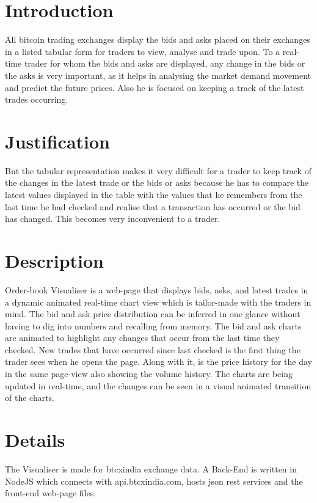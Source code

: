 \documentclass[12pt, a4paper]{report}
\begin{document}
\pagestyle{plain}
\def\title{Recommendation of tags in  using Metapaths}
\def\what{B. Tech Project Report}
\def\who{Prithwish Mukherjee (12CS10058)}
\def\guide{Prof. Animesh Mukherjee and Prof. Pawan Goyal}

\section{Introduction}

All bitcoin trading exchanges display the bids and asks placed on their exchanges in a listed tabular form for traders to view, analyse and trade upon. To a real-time trader for whom the bids and asks are displayed, any change in the bids or the asks is very important, as it helps in analysing the market demand movement and predict the future prices. Also he is focused on keeping a track of the latest trades occurring.

\section{Justification}

But the tabular representation makes it very difficult for a trader to keep track of the changes in the latest trade or the bids or asks because he has to compare the latest values displayed in the table with the values that he remembers from the last time he had checked and realise that a transaction has occurred or the bid has changed. This becomes very inconvenient to a trader.

\section{Description}

Order-book Visualiser is a web-page that displays bids, asks, and latest trades in a dynamic animated real-time chart view which is tailor-made with the traders in mind. The bid and ask price distribution can be inferred in one glance without having to dig into numbers and recalling from memory. The bid and ask charts are animated to highlight any changes that occur from the last time they checked. New trades that have occurred since last checked is the first thing the trader sees when he opens the page. Along with it, is the price history for the day in the same page-view also showing the volume history. The charts are being updated in real-time, and the changes can be seen in a visual animated transition of the charts.

\section{Details}

The Visualiser is made for btcxindia exchange data.
A Back-End is written in NodeJS which connects with api.btcxindia.com, hosts json rest services and the front-end web-page files.
\end{document}
